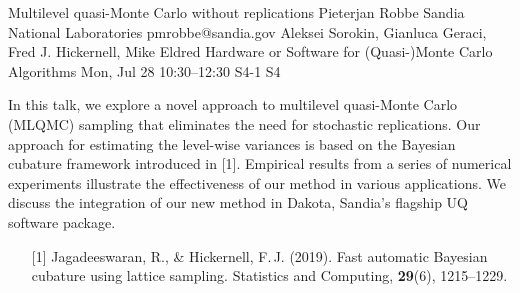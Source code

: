 \begin{talk}
  {Multilevel quasi-Monte Carlo without replications}%
  {Pieterjan Robbe}%
  {Sandia National Laboratories}%
  {pmrobbe@sandia.gov}%
  {Aleksei Sorokin, Gianluca Geraci, Fred J. Hickernell, Mike Eldred}%
  {Hardware or Software for (Quasi-)Monte Carlo Algorithms}%
  {Mon, Jul 28 10:30–12:30}%
  {S4-1}%
  {S4}%
				
			
In this talk, we explore a novel approach to multilevel quasi-Monte Carlo (MLQMC) sampling that eliminates the need for stochastic replications. Our approach for estimating the level-wise variances is based on the Bayesian cubature framework introduced in [1]. Empirical results from a series of numerical experiments illustrate the effectiveness of our method in various applications. We discuss the integration of our new method in Dakota, Sandia's flagship UQ software package.

\medskip

\begin{enumerate}
  \item[{[1]}] Jagadeeswaran, R., \& Hickernell, F.\,J. (2019). Fast automatic Bayesian cubature using lattice sampling. Statistics and Computing, \textbf{29}(6), 1215--1229.
\end{enumerate}

\end{talk}


